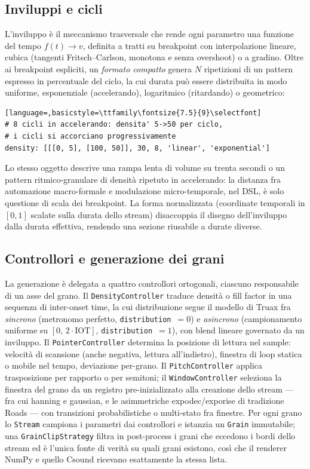 \documentclass[10pt,twocolumn,a4paper]{article}
\begin{document}
\subsection{Inviluppi e cicli}

L'inviluppo è il meccanismo trasversale che rende ogni parametro una
funzione del tempo $f(t)\to v$, definita a tratti su breakpoint con
interpolazione lineare, cubica (tangenti Fritsch--Carlson, monotona e
senza overshoot) o a gradino. Oltre ai breakpoint espliciti, un
\emph{formato compatto} genera $N$ ripetizioni di un pattern espresso in
percentuale del ciclo, la cui durata può essere distribuita in modo
uniforme, esponenziale (accelerando), logaritmico (ritardando) o
geometrico:

\begin{lstlisting}[language=,basicstyle=\ttfamily\fontsize{7.5}{9}\selectfont]
# 8 cicli in accelerando: densita' 5->50 per ciclo,
# i cicli si accorciano progressivamente
density: [[[0, 5], [100, 50]], 30, 8, 'linear', 'exponential']
\end{lstlisting}

Lo stesso oggetto descrive una rampa lenta di volume su trenta secondi o
un pattern ritmico-granulare di densità ripetuto in accelerando: la
distanza fra automazione macro-formale e modulazione micro-temporale,
nel DSL, è solo questione di scala dei breakpoint. La forma normalizzata
(coordinate temporali in $[0,1]$ scalate sulla durata dello stream)
disaccoppia il disegno dell'inviluppo dalla durata effettiva, rendendo
una sezione riusabile a durate diverse.

\subsection{Controllori e generazione dei grani}

La generazione è delegata a quattro controllori ortogonali, ciascuno
responsabile di un asse del grano. Il \texttt{DensityController}
traduce densità o fill factor in una sequenza di inter-onset time, la
cui distribuzione segue il modello di Truax fra \emph{sincrono}
(metronomo perfetto, \texttt{distribution}~$=0$) e \emph{asincrono}
(campionamento uniforme su $[0,\,2\cdot\text{IOT}]$,
\texttt{distribution}~$=1$), con blend lineare governato da un
inviluppo. Il \texttt{PointerController} determina la posizione di
lettura nel sample: velocità di scansione (anche negativa, lettura
all'indietro), finestra di loop statica o mobile nel tempo, deviazione
per-grano. Il \texttt{PitchController} applica trasposizione per
rapporto o per semitoni; il \texttt{WindowController} seleziona la
finestra del grano da un registro pre-inizializzato alla creazione
dello stream --- fra cui hanning e gaussian, e le asimmetriche
expodec/exporise di tradizione Roads --- con transizioni probabilistiche
o multi-stato fra finestre. Per ogni grano lo \texttt{Stream} campiona i
parametri dai controllori e istanzia un \texttt{Grain} immutabile; una
\texttt{GrainClipStrategy} filtra in post-process i grani che eccedono i
bordi dello stream ed è l'unica fonte di verità su quali grani esistono,
così che il renderer NumPy e quello Csound ricevano esattamente la
stessa lista.
\end{document}
